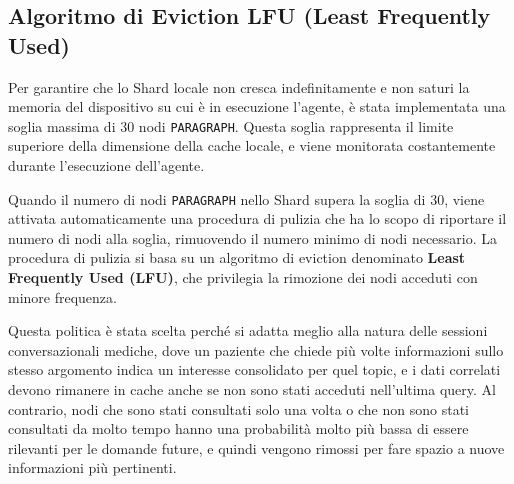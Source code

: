 \newpage

\subsection{Algoritmo di Eviction LFU (Least Frequently Used)}

Per garantire che lo Shard locale non cresca indefinitamente e non saturi la memoria del dispositivo su cui è in esecuzione l'agente, è stata implementata una soglia massima di 30 nodi \texttt{PARAGRAPH}. Questa soglia rappresenta il limite superiore della dimensione della cache locale, e viene monitorata costantemente durante l'esecuzione dell'agente.

Quando il numero di nodi \texttt{PARAGRAPH} nello Shard supera la soglia di 30, viene attivata automaticamente una procedura di pulizia che ha lo scopo di riportare il numero di nodi alla soglia, rimuovendo il numero minimo di nodi necessario. La procedura di pulizia si basa su un algoritmo di eviction denominato \textbf{Least Frequently Used (LFU)}, che privilegia la rimozione dei nodi acceduti con minore frequenza.

Questa politica è stata scelta perché si adatta meglio alla natura delle sessioni conversazionali mediche, dove un paziente che chiede più volte informazioni sullo stesso argomento indica un interesse consolidato per quel topic, e i dati correlati devono rimanere in cache anche se non sono stati acceduti nell'ultima query. Al contrario, nodi che sono stati consultati solo una volta o che non sono stati consultati da molto tempo hanno una probabilità molto più bassa di essere rilevanti per le domande future, e quindi vengono rimossi per fare spazio a nuove informazioni più pertinenti.